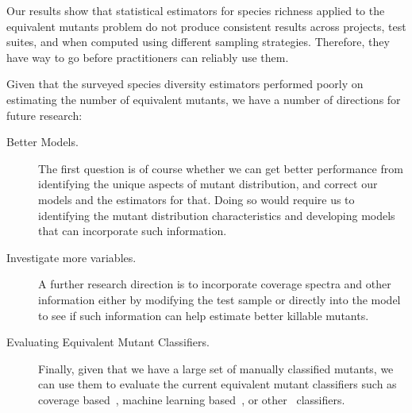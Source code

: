 \documentclass[sigconf,review,anonymous]{acmart}
\newcounter{todocounter}
\newcommand{\todo}[1]{\marginpar{$|$}\textcolor{red}{\stepcounter{todocounter}\footnote[\thetodocounter]{\textcolor{red}{\textbf{TODO }}\textit{#1}}}}
\renewcommand{\todo}[1]{}
\begin{document}
Our results show that statistical estimators for species richness applied to 
the equivalent mutants problem do not produce consistent results across
projects, test suites, and when computed using different sampling strategies.
Therefore, they have way to go before practitioners can reliably use them.


Given that the surveyed species diversity estimators performed poorly on
estimating the number of equivalent mutants, we have a number of directions
for future research:

\begin{description}
\item[Better Models.] The first question is of course whether we can get better
performance from identifying the unique aspects of mutant distribution, and
correct our models and the estimators for that. 
%
Doing so would require us to identifying the mutant distribution characteristics
and developing models that can incorporate such information. 

\item[Investigate more variables.] A further research direction is to incorporate
 coverage spectra and other information either by modifying the test sample
or directly into the model to see if such information can help estimate better
killable mutants.

\item[Evaluating Equivalent Mutant Classifiers.] Finally, given that we have a large set
of manually classified mutants, we can use them to evaluate the current
equivalent mutant classifiers such as coverage
based~\cite{schuler2013covering}, machine learning
based~\cite{peacock2021automatic,naem2020a}, or
other~\cite{papadakis2013mutation} classifiers.


\end{description}
\end{document}
